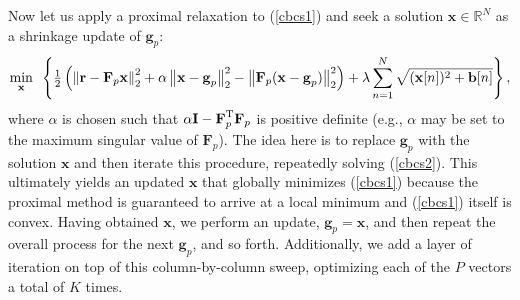 \documentclass[final]{siamltex}
\newcommand{\field}[1]{\mathbb{#1}}
\newcommand{\la}[1]{\mbox{$\mathbf{#1}$}}  \newcommand{\sst}[1]{\mbox{\scriptsize{#1}}}
\begin{document}
    Now let us apply a proximal relaxation \cite{Dau2004, Fig2007,
    Com2007} to (\ref{cbcs1}) and seek a solution $\la{x} \in
    \field{R}^{N}$ as a shrinkage update of $\la{g}_p$:
    \begin{equation}\label{cbcs2}
      \mathop{\mbox{min}}_{\mbox{\scriptsize{$\la{x}$}}}
      \mbox{  }
       \left  \{ \tfrac{1}{2} \left(
                 \left \Vert \la{r} - \la{F}_p \la{x}     \right \Vert_2^2 +
          \alpha \left \Vert \la{x} - \la{g}_p            \right \Vert_2^2 -
                 \left \Vert \la{F}_p (\la{x} - \la{g}_p) \right \Vert_2^2 \right) + 
         \lambda \sum_{n=1}^{N} \sqrt{ (\la{x}[n])^2 + \la{b}[n] }
       \right \},
    \end{equation}
    where $\alpha$ is chosen such that $\alpha\la{I} -
    \la{F}_p^{\sst{T}} \la{F}_p$ is positive definite (e.g., $\alpha$
    may be set to the maximum singular value of $\la{F}_p$).  The idea
    here is to replace $\la{g}_p$ with the solution \la{x} and then
    iterate this procedure, repeatedly solving (\ref{cbcs2}).  This
    ultimately yields an updated \la{x} that globally minimizes
    (\ref{cbcs1}) because the proximal method is guaranteed to arrive
    at a local minimum \cite{Dau2004, Fig2007} and (\ref{cbcs1})
    itself is convex.  Having obtained \la{x}, we perform an update,
    $\la{g}_p = \la{x}$, and then repeat the overall process for the
    next $\la{g}_p$, and so forth.  Additionally, we add a layer of
    iteration on top of this column-by-column sweep, optimizing each
    of the $P$ vectors a total of $K$ times.
\end{document}
